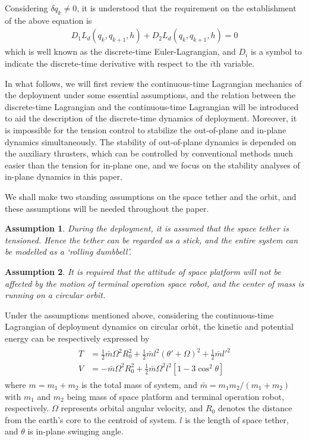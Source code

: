 \documentclass[10pt,final,journal]{IEEEtran}
\newtheorem{myas}{Assumption}
\begin{document}
Considering  $\delta q_k\neq 0$, it is understood that the requirement on the establishment of the above equation is 
\begin{align}\label{eq:discrete EL}
	D_1L_d(q_k,q_{k+1},h)+D_2L_d(q_k,q_{k+1},h)=0
\end{align}
which is well known as the discrete-time Euler-Lagrangian, and $D_i$ is a symbol to indicate the discrete-time derivative with respect to the $i$th variable.

In what follows, we will first review the continuous-time Lagrangian mechanics of the deployment under some essential assumptions, and the relation between the discrete-time Lagrangian and the continuous-time Lagrangian will be introduced to aid the description of the discrete-time dynamics of deployment. Moreover, it is impossible for the tension control to stabilize the out-of-plane and in-plane dynamics simultaneously. The stability of out-of-plane dynamics is depended on the auxiliary thrusters, which can be controlled by conventional methods much easier than the tension for in-plane one, and we focus on the stability analyses of in-plane dynamics in this paper.  

We shall make two standing assumptions on the space tether and the orbit, and these assumptions will be needed throughout the paper.  
\begin{myas}
	During the deployment, it is assumed that the space tether is tensioned. Hence the tether can be regarded as a stick, and the entire system can be modelled as a `rolling dumbbell'.
\end{myas}
\begin{myas}
	It is required that the attitude of space platform will not be affected by the motion of terminal operation space robot, and the center of mass is running on a circular orbit.
\end{myas}

Under the assumptions mentioned above, considering the continuous-time Lagrangian of deployment dynamics on circular orbit, the kinetic and potential energy can be respectively expressed by
	\begin{align}\begin{split}
	T&=\frac{1}{2}\bar m\Omega^2R_0^2+\frac{1}{2}\bar{m}l^2(\theta'+\Omega)^2+\frac{1}{2}\bar{m}l'^2\\
	V&=-\bar m\Omega^2R^2_0+\frac{1}{2}\bar{m}\Omega^2l^2[1-3\cos^2\theta]
	\end{split}\end{align}
	where $m=m_1+m_2$ is the total mass of system, and $\bar m=m_1m_2/(m_1+m_2)$ with $m_1$ and $m_2$ being mass of space platform and terminal operation robot, respectively. $\Omega$ represents orbital angular velocity, and $R_0$ denotes the distance from the earth's core to the centroid of system. $l$ is the length of space tether, and $\theta$ is in-plane swinging angle. 
	
\end{document}
